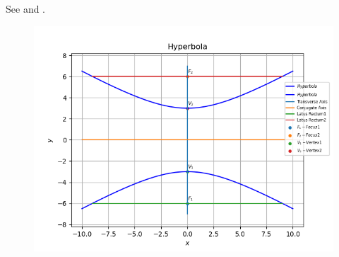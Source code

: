 See 
and 
.
\begin{figure}[!h]
	\begin{center} 
	    \includegraphics[width=\columnwidth]{chapters/11/11/4/2/figs/hyperbola}
	\end{center}
\caption{}
\label{fig:chapters/11/11/4/2/Fig1}
\end{figure}



